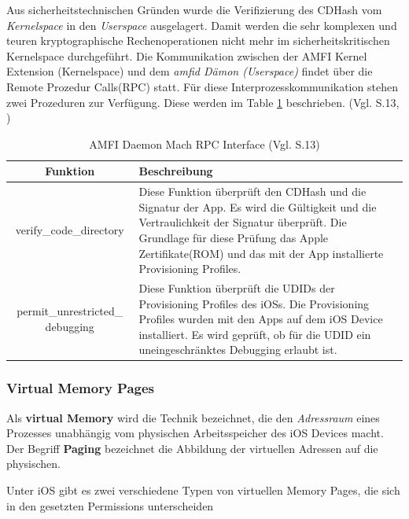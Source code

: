  Aus sicherheitstechnischen Gründen wurde die Verifizierung des CDHash vom \textit{\glqq Kernelspace\grqq{}} in den \textit{\glqq Userspace\grqq{}} ausgelagert. Damit werden die sehr komplexen und teuren kryptographische Rechenoperationen nicht mehr im sicherheitskritischen Kernelspace durchgeführt. Die Kommunikation zwischen der AMFI Kernel Extension (Kernelspace) und dem \textit{\glqq amfid Dämon (Userspace)\grqq{}} findet über die Remote Prozedur Calls(RPC) statt. Für diese Interprozesskommunikation stehen zwei Prozeduren zur Verfügung. Diese werden im Table \ref{tab:AMFID} beschrieben. (Vgl. \cite{iOSSec[5]} S.13, \cite{Mach[1]}) 

\begin{table}[ht]
\begin{center}
\begin{tabular}{|c|p{}|} \hline
  Funktion & Beschreibung\\ \hline
verify\_code\_directory &  
Diese Funktion überprüft den CDHash und die Signatur der App. Es wird die Gültigkeit und die Vertraulichkeit der Signatur überprüft. Die Grundlage für diese Prüfung das Apple Zertifikate(ROM) und das mit der App installierte Provisioning Profiles.\\ \hline

permit\_unrestricted\_ debugging &  
Diese Funktion überprüft die UDIDs der Provisioning Profiles des iOSs. Die Provisioning Profiles wurden mit den Apps auf dem iOS Device installiert. Es wird geprüft, ob für die UDID ein uneingeschränktes Debugging erlaubt ist. \\ \hline
\end{tabular} 
\caption{AMFI Daemon Mach RPC Interface (Vgl. \cite{iOSSec[5]} S.13)}
\label{tab:AMFID}
\end{center}
\end{table}

\subsubsection{Virtual Memory Pages}
\label{sec:virMemoryPages}
 Als \textbf{virtual Memory} wird die Technik bezeichnet, die den \textit{\glqq Adressraum\grqq{}} eines Prozesses unabhängig vom physischen Arbeitsspeicher des iOS Devices macht. Der Begriff \textbf{Paging} bezeichnet die Abbildung der virtuellen Adressen auf die physischen.\par 
Unter iOS gibt es zwei verschiedene Typen von virtuellen Memory Pages, die sich in den gesetzten Permissions unterscheiden 

